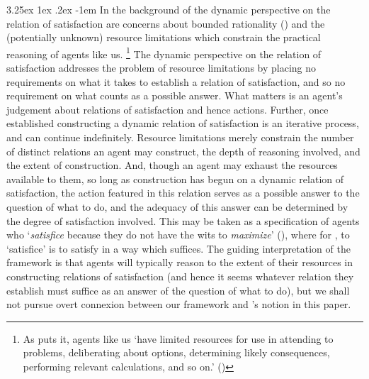 \documentclass[10pt]{article}
\makeatletter
\renewcommand\paragraph{\@startsection{paragraph}{5}{\z@}%
  {3.25ex \@plus1ex \@minus.2ex}%
  {-1em}%
  {\normalfont\normalsize\bfseries}}
\makeatother
\begin{document}
\paragraph{ }%
In the background of the dynamic perspective on the relation of satisfaction are concerns about bounded rationality (\cite{Simon:1957aa})  and the (potentially unknown) resource limitations which constrain the practical reasoning of agents like us.\nolinebreak
\footnote{As \citeauthor{Bratman:1987aa} puts it, agents like us `have limited resources for use in attending to problems, deliberating about options, determining likely consequences, performing relevant calculations, and so on.' (\citeyear[10]{Bratman:1987aa})}
The dynamic perspective on the relation of satisfaction addresses the problem of resource limitations by placing no requirements on what it takes to establish a relation of satisfaction, and so no requirement on what counts as a possible answer.
What matters is an agent's judgement about relations of satisfaction and hence actions.
Further, once established constructing a dynamic relation of satisfaction is an iterative process, and can continue indefinitely.
Resource limitations merely constrain the number of distinct relations an agent may construct, the depth of reasoning involved, and the extent of construction.
And, though an agent may exhaust the resources available to them, so long as construction has begun on a dynamic relation of satisfaction, the action featured in this relation serves as a possible answer to the question of what to do, and the adequacy of this answer can be determined by the degree of satisfaction involved.
This may be taken as a specification of agents who `\emph{satisfice} because they do not have the wits to \emph{maximize}' (\citeyear[118]{Simon:1957aa}), where for \citeauthor{Simon:1957aa}, to `satisfice' is to satisfy in a way which suffices.
The guiding interpretation of the framework is that agents will typically reason to the extent of their resources in constructing relations of satisfaction (and hence it seems whatever relation they establish must suffice as an answer of the question of what to do), but we shall not pursue overt connexion between our framework and \citeauthor{Simon:1957aa}'s notion in this paper.

\end{document}
